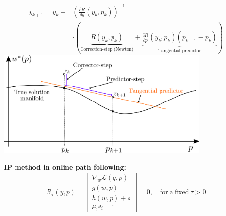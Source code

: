 \begin{tcolorbox}[colback=violet!5!white, %
  colframe=violet!75!black, %
  title=\textbf{Parametric Nonlinear Optimization}]
\begin{itemize}
  \end{itemize}
  \begin{align*}
    y_{k+1}=y_k - 
    &\left(
    \frac{\partial R}{\partial y}(y_k, p_k)
    \right)^{-1} \\
    & \cdot
    \left(
      \underbrace{R(y_k, p_k)}_{\text{Correction-step (Newton)}} +
      \underbrace{\frac{\partial R}{\partial p}(y_k, p_k)(p_{k+1} - p_k)}_{\text{Tangential predictor}}
    \right)
  \end{align*}
  \includegraphics[width=0.8\textwidth]{pred_correct_alg}

  \textbf{IP method in online path following:}
  \begin{align}
    R_\tau(y,p) = 
    \left[
    \begin{array}{c}
      \nabla_w\mathcal{L}(y,p) \\ g(w,p) \\ h(w,p) + s \\ \mu_is_i - \tau
    \end{array}
    \right] = 0,\quad \mathrm{for\ a\ fixed\ }\tau > 0
  \end{align}
\end{tcolorbox}

